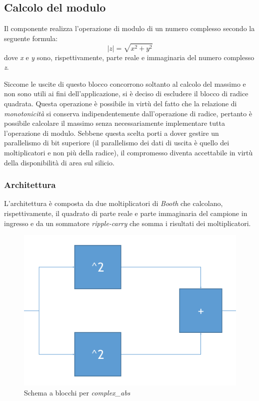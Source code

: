 \documentclass[12pt,a4paper,twoside,openany]{book}
\newcommand\abs[1]{\left|#1\right|}
\begin{document}
\subsection{Calcolo del modulo}
Il componente realizza l'operazione di modulo di un numero complesso secondo la seguente formula:
$$
\abs{z} = \sqrt{x^{2}+y^{2}}
$$
dove \textit{x} e \textit{y} sono, rispettivamente, parte reale e immaginaria del numero complesso \textit{z}.

Siccome le uscite di questo blocco concorrono soltanto al calcolo del massimo e non sono utili ai fini dell'applicazione, si è deciso di escludere il blocco di radice quadrata. Questa operazione è possibile in virtù del fatto che la relazione di \textit{monotonicità} si conserva indipendentemente dall'operazione di radice, pertanto è possibile calcolare il massimo senza necessariamente implementare tutta l'operazione di modulo. Sebbene questa scelta porti a dover gestire un parallelismo di bit superiore (il parallelismo dei dati di uscita è quello dei moltiplicatori e non più della radice), il compromesso diventa accettabile in virtù della disponibilità di area sul silicio.
\subsubsection{Architettura}
L'architettura è composta da due moltiplicatori di \textit{Booth} che calcolano, rispettivamente, il quadrato di parte reale e parte immaginaria del campione in ingresso e da un sommatore \textit{ripple-carry} che somma i risultati dei moltiplicatori.

\begin{figure}[hb]
\begin{center}
\includegraphics[scale=0.5, keepaspectratio]{immagini/complexabs_schemablocchi}
\caption{Schema a blocchi per \textit{complex\_abs}}
\label{complexabs_schemablocchi}
\end{center}
\end{figure}
\end{document}
